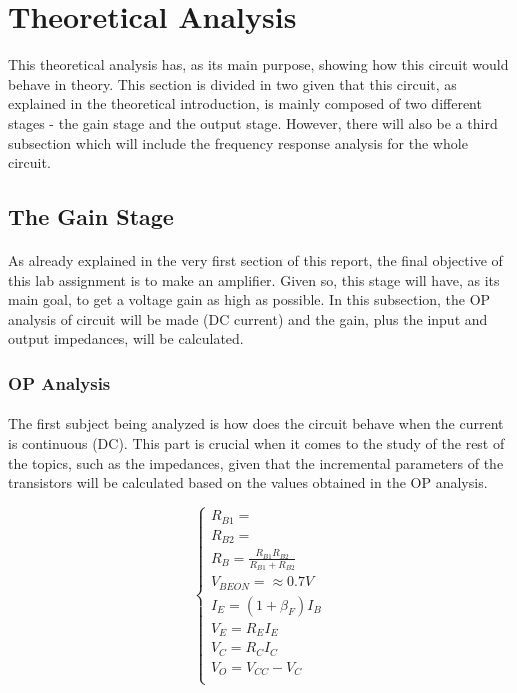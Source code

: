 \section{Theoretical Analysis}
\label{analysis}


This theoretical analysis has, as its main purpose, showing how this circuit would behave in theory. This section is divided in two given that this circuit, as explained in the theoretical introduction, is mainly composed of two different stages - the gain stage and the output stage. However, there will also be a third subsection which will include the frequency response analysis for the whole circuit.



\subsection{The Gain Stage}

\paragraph{}As already explained in the very first section of this report, the final objective of this lab assignment is to make an amplifier. Given so, this stage will have, as its main goal, to get a voltage gain as high as possible. In this subsection, the OP analysis of circuit will be made (DC current) and the gain, plus the input and output impedances,  will be calculated.


\subsubsection{OP Analysis}

\paragraph{}The first subject being analyzed is how does the circuit behave when the current is continuous (DC). This part is crucial when it comes to the study of the rest of the topics, such as the impedances, given that the incremental parameters of the transistors will be calculated based on the values obtained in the OP analysis.


\[ 
\left\{\begin{matrix}
R_{B1}=\\
R_{B2}=\\
R_B=\frac{R_{B1}R_{B2}}{R_{B1}+R_{B2}}\\
V_{BEON}=\approx 0.7 V\\
I_E=(1+\beta_F)I_B\\
V_E=R_E I_E\\
V_C=R_C I_C\\
V_O=V_{CC}-V_C\\
\end{matrix}\right.
\]


